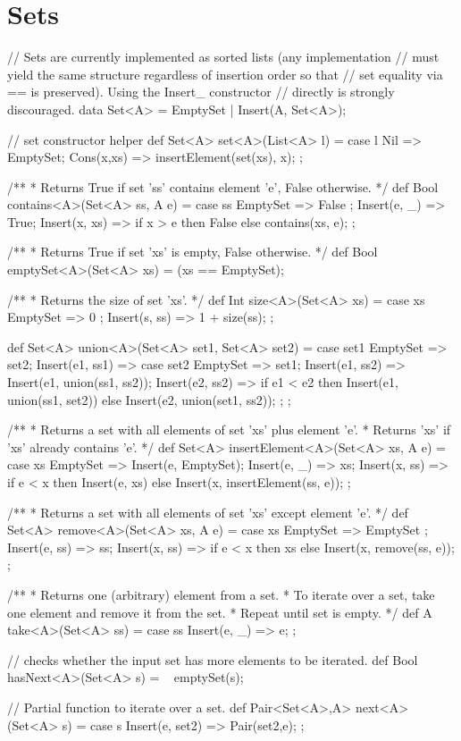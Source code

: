 \section{Sets}

\begin{abscode}
// Sets are currently implemented as sorted lists (any implementation
// must yield the same structure regardless of insertion order so that
// set equality via == is preserved).  Using the Insert_ constructor
// directly is strongly discouraged.
data Set<A> = EmptySet | Insert(A, Set<A>);

// set constructor helper
def Set<A> set<A>(List<A> l) = 
    case l { 
       Nil => EmptySet; 
       Cons(x,xs) => insertElement(set(xs), x);
    };

/**
 * Returns True if set 'ss' contains element 'e', False otherwise.
 */
def Bool contains<A>(Set<A> ss, A e) =
  case ss {
    EmptySet => False ;
    Insert(e, _) => True;
    Insert(x, xs) => if x > e then False else contains(xs, e);
  };
  
/**
 * Returns True if set 'xs' is empty, False  otherwise.
 */
def Bool emptySet<A>(Set<A> xs) = (xs == EmptySet); 

/**
 * Returns the size of set 'xs'.
 */
def Int size<A>(Set<A> xs) = 
   case xs {
      EmptySet => 0 ; 
      Insert(s, ss) => 1 + size(ss); 
   };

def Set<A> union<A>(Set<A> set1, Set<A> set2) =
   case set1 {
      EmptySet => set2;
      Insert(e1, ss1) =>  case set2 {
          EmptySet => set1;
          Insert(e1, ss2) => Insert(e1, union(ss1, ss2));
          Insert(e2, ss2) =>
            if e1 < e2
            then Insert(e1, union(ss1, set2))
            else Insert(e2, union(set1, ss2));
      };
   }; 

/**
 * Returns a set with all elements of set 'xs' plus element 'e'.
 * Returns 'xs' if 'xs' already contains 'e'.
 */
def Set<A> insertElement<A>(Set<A> xs, A e) =
  case xs {
      EmptySet => Insert(e, EmptySet);
      Insert(e, _) => xs;
      Insert(x, ss) => if e < x then Insert(e, xs) else Insert(x, insertElement(ss, e));
  };


/**
 * Returns a set with all elements of set 'xs' except element 'e'.
 */
def Set<A> remove<A>(Set<A> xs, A e) = 
  case xs {
     EmptySet => EmptySet ;
     Insert(e, ss) => ss;
     Insert(x, ss) => if e < x then xs else Insert(x, remove(ss, e));
  };

/**
 * Returns one (arbitrary) element from a set.
 * To iterate over a set, take one element and remove it from the set.
 * Repeat until set is empty.
 */
def A take<A>(Set<A> ss) =
  case ss {
    Insert(e, _) => e;
  };

// checks whether the input set has more elements to be iterated.
def Bool hasNext<A>(Set<A> s) = ~ emptySet(s); 

// Partial function to iterate over a set.
def Pair<Set<A>,A> next<A>(Set<A> s) = 
   case s { 
      Insert(e, set2) => Pair(set2,e); 
   };
\end{abscode}

